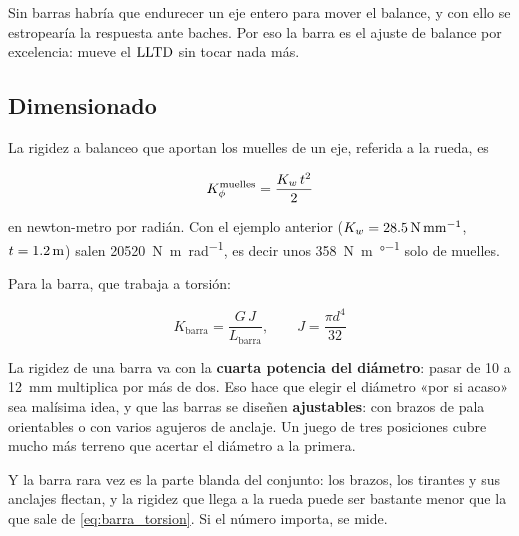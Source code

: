 Sin barras habría que endurecer un eje entero para mover el balance, y con ello
se estropearía la respuesta ante baches. Por eso la barra es el ajuste de
balance por excelencia: mueve el $\mathrm{LLTD}$ sin tocar nada más.

\subsection{Dimensionado}

La rigidez a balanceo que aportan los muelles de un eje, referida a la rueda,
es

\begin{equation}
  K_{\phi}^{\text{muelles}} = \frac{K_w\,t^{2}}{2}
  \label{eq:rigidez_balanceo_muelles}
\end{equation}

en newton-metro por radián. Con el ejemplo anterior
($K_w = \SI{28.5}{\newton\per\milli\meter}$, $t = \SI{1.2}{\meter}$) salen
\SI{20520}{\newton\meter\per\radian}, es decir unos
\SI{358}{\newton\meter\per\degree} solo de muelles.

Para la barra, que trabaja a torsión:

\begin{equation}
  K_{\text{barra}} = \frac{G\,J}{L_{\text{barra}}},
  \qquad J = \frac{\pi d^{4}}{32}
  \label{eq:barra_torsion}
\end{equation}

\begin{ojo}
La rigidez de una barra va con la \textbf{cuarta potencia del diámetro}: pasar
de \num{10} a \SI{12}{\milli\meter} multiplica por más de dos. Eso hace que
elegir el diámetro «por si acaso» sea malísima idea, y que las barras se
diseñen \textbf{ajustables}: con brazos de pala orientables o con varios
agujeros de anclaje. Un juego de tres posiciones cubre mucho más terreno que
acertar el diámetro a la primera.

Y la barra rara vez es la parte blanda del conjunto: los brazos, los tirantes y
sus anclajes flectan, y la rigidez que llega a la rueda puede ser bastante menor
que la que sale de \eqref{eq:barra_torsion}. Si el número importa, se mide.
\end{ojo}


